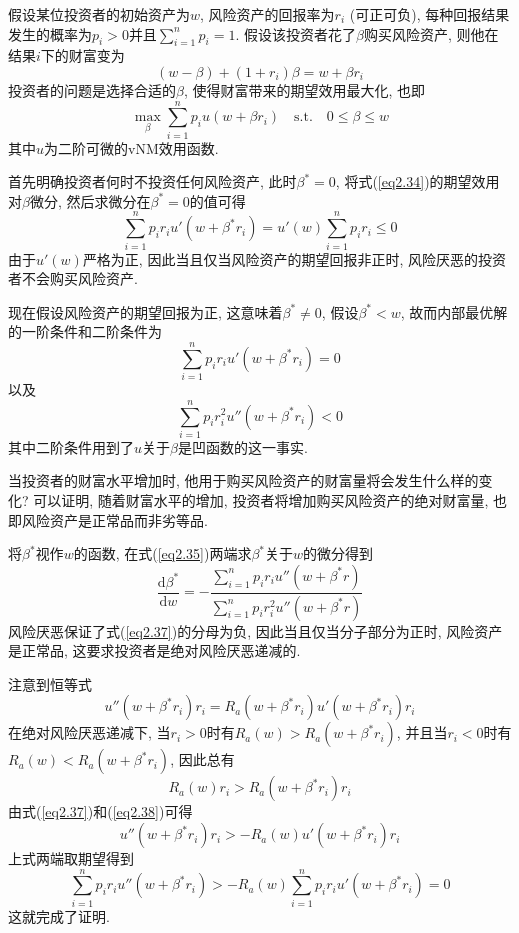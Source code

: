 \documentclass[cn, 12pt, math=mtpro2, bibstyle=apa, blue]{elegantbook}
\begin{document}
\begin{example}
假设某位投资者的初始资产为$w$, 风险资产的回报率为$r_i$ (可正可负), 每种回报结果发生的概率为$p_i>0$并且$\sum_{i=1}^{n}p_i=1$. 假设该投资者花了$\beta$购买风险资产, 则他在结果$i$下的财富变为
$$(w-\beta)+(1+r_i)\beta=w+\beta r_i$$
投资者的问题是选择合适的$\beta$, 使得财富带来的期望效用最大化, 也即
\begin{equation}\label{eq2.34}
  \max_\beta \sum_{i=1}^{n}p_iu(w+\beta r_i)\quad \text{s.t.}\quad 0\leq \beta\leq w
\end{equation}
其中$u$为二阶可微的vNM效用函数.

首先明确投资者何时不投资任何风险资产, 此时$\beta^\ast=0$, 将式(\ref{eq2.34})的期望效用对$\beta$微分, 然后求微分在$\beta^\ast=0$的值可得
$$\sum_{i=1}^{n}p_ir_iu'(w+\beta^\ast r_i)=u'(w)\sum_{i=1}^{n}p_ir_i\leq 0$$
由于$u'(w)$严格为正, 因此当且仅当风险资产的期望回报非正时, 风险厌恶的投资者不会购买风险资产.

现在假设风险资产的期望回报为正, 这意味着$\beta^\ast\neq 0$, 假设$\beta^\ast<w$, 故而内部最优解的一阶条件和二阶条件为
\begin{equation}\label{eq2.35}
  \sum_{i=1}^{n}p_ir_iu'(w+\beta^\ast r_i)=0
\end{equation}
以及
\begin{equation}\label{eq2.36}
\sum_{i=1}^{n}p_ir_i^2u''(w+\beta^\ast r_i)<0
\end{equation}
其中二阶条件用到了$u$关于$\beta$是凹函数的这一事实.

当投资者的财富水平增加时, 他用于购买风险资产的财富量将会发生什么样的变化? 可以证明, 随着财富水平的增加, 投资者将增加购买风险资产的绝对财富量, 也即风险资产是正常品而非劣等品.

将$\beta^\ast$视作$w$的函数, 在式(\ref{eq2.35})两端求$\beta^\ast$关于$w$的微分得到
\begin{equation}\label{eq2.37}
  \frac{\text{d}\beta^\ast}{\text{d}w}=-\frac{\sum_{i=1}^{n}p_ir_iu''(w+\beta^\ast r)}{\sum_{i=1}^{n}p_ir_i^2u''(w+\beta^\ast r)}
\end{equation}
风险厌恶保证了式(\ref{eq2.37})的分母为负, 因此当且仅当分子部分为正时, 风险资产是正常品, 这要求投资者是绝对风险厌恶递减的.

注意到恒等式
$$u''(w+\beta^\ast r_i)r_i=R_a(w+\beta^\ast r_i)u'(w+\beta^\ast r_i)r_i$$
在绝对风险厌恶递减下, 当$r_i>0$时有$R_a(w)>R_a(w+\beta^\ast r_i)$, 并且当$r_i<0$时有$R_a(w)<R_a(w+\beta^\ast r_i)$, 因此总有
\begin{equation}\label{eq2.38}
  R_a(w)r_i>R_a(w+\beta^\ast r_i)r_i
\end{equation}
由式(\ref{eq2.37})和(\ref{eq2.38})可得
$$u''(w+\beta^\ast r_i)r_i>-R_a(w)u'(w+\beta^\ast r_i)r_i$$
上式两端取期望得到
$$\sum_{i=1}^{n}p_ir_iu''(w+\beta^\ast r_i)>-R_a(w)\sum_{i=1}^{n}p_ir_iu'(w+\beta^\ast r_i)=0$$
这就完成了证明.

\end{example}
\end{document}
